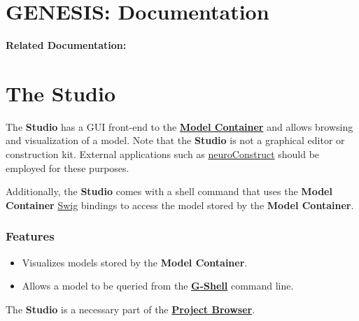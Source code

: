 \documentclass[12pt]{article}
\begin{document}
\section*{GENESIS: Documentation}

{\bf Related Documentation:}

\section*{The Studio}

The {\bf Studio} has a GUI front-end to the \href{../model-container/model-container.tex}{\bf Model Container} and allows browsing and visualization of a model. Note that the {\bf Studio} is not a graphical editor or construction kit. External applications such as \href{http://www.physiol.ucl.ac.uk/research/silver\_a/neuroConstruct/}{neuroConstruct} should be employed for these purposes.

Additionally, the {\bf Studio} comes with a shell command that uses the {\bf Model Container} \href{http://www.swig.org/}{Swig} bindings to access the model stored by the {\bf Model Container}.

\subsubsection*{Features}

\begin{itemize}

\item Visualizes models stored by the {\bf Model Container}.

\item  Allows a model to be queried from the \href{../gshell/gshell.tex}{\bf G-Shell} command line.

\end{itemize}
The {\bf Studio} is a necessary part of the \href{../project-browser/project-browser.tex}{\bf Project Browser}.
\end{document}

